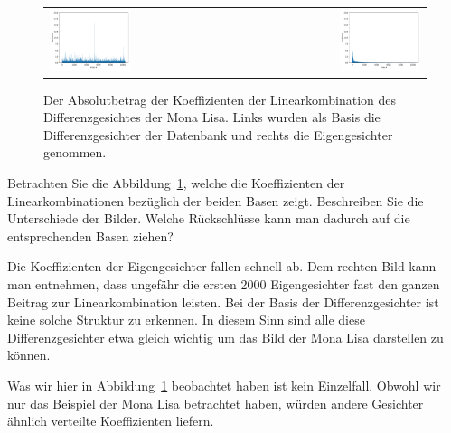 \begin{figure}[ht]
	\centering
	\begin{tabular}{lr}
		\includegraphics[width=0.45\textwidth]{images/eigenfaces/naive_coef} & \includegraphics[width=0.45\textwidth]{images/eigenfaces/eigen_coef} \\
	\end{tabular}
	\caption{Der Absolutbetrag der Koeffizienten der Linearkombination des Differenzgesichtes der Mona Lisa. Links wurden als Basis die Differenzgesichter der Datenbank und rechts die Eigengesichter genommen.}
	\label{fig:coef}
\end{figure}
\begin{aufgabe}
	Betrachten Sie die Abbildung~\ref{fig:coef}, welche die Koeffizienten der Linearkombinationen bezüglich der beiden Basen zeigt.
	Beschreiben Sie die Unterschiede der Bilder.
	Welche Rückschlüsse kann man dadurch auf die entsprechenden Basen ziehen?
\end{aufgabe}
\begin{losung*}
	Die Koeffizienten der Eigengesichter fallen schnell ab.
	Dem rechten Bild kann man entnehmen, dass ungefähr die ersten 2000 Eigengesichter fast den ganzen Beitrag zur Linearkombination leisten.
	Bei der Basis der Differenzgesichter ist keine solche Struktur zu erkennen.
	In diesem Sinn sind alle diese Differenzgesichter etwa gleich wichtig um das Bild der Mona Lisa darstellen zu können.
\end{losung*}
Was wir hier in Abbildung~\ref{fig:coef} beobachtet haben ist kein Einzelfall.
Obwohl wir nur das Beispiel der Mona Lisa betrachtet haben, würden andere Gesichter ähnlich verteilte Koeffizienten liefern.
